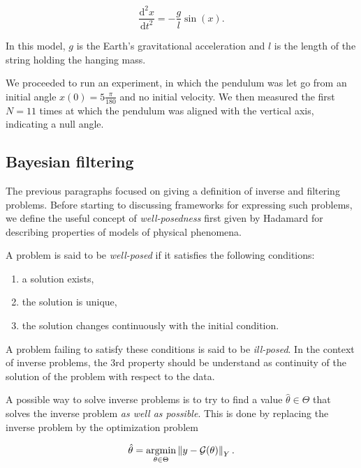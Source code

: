 \begin{equation}
  \frac{\text{d}^2x}{\text{d}t^2} = -\frac{g}{l}\sin(x).
\end{equation}

In this model, $g$ is the Earth's gravitational acceleration and $l$ is the length of the string holding the hanging mass.

We proceeded to run an experiment, in which the pendulum was let go from an initial angle $x(0) = 5\frac{\pi}{180}$ and no initial velocity. We then measured the first $N = 11$ times at which the pendulum was aligned with the vertical axis, indicating a null angle.

\subsection{Bayesian filtering}

The previous paragraphs focused on giving a definition of inverse and filtering problems. Before starting to discussing frameworks for expressing such problems, we define the useful concept of \textit{well-posedness} first given by Hadamard for describing properties of models of physical phenomena.

\begin{definition} A problem is said to be \textit{well-posed} if it satisfies the following conditions:
  \begin{enumerate}
  \item{a solution exists,}
  \item{the solution is unique,}
  \item{the solution changes continuously with the initial condition.}
  \end{enumerate}

  A problem failing to satisfy these conditions is said to be \textit{ill-posed}. In the context of inverse problems, the 3rd property should be understand as continuity of the solution of the problem with respect to the data.  
\end{definition}

A possible way to solve inverse problems is to try to find a value $\hat \theta \in \Theta$ that solves the inverse problem \textit{as well as possible}. This is done by replacing the inverse problem by the optimization problem

\begin{equation*}
  \hat\theta = \underset{\theta \in \Theta}{\text{argmin}} \left\lVert y - \mathcal{G}(\theta) \right\rVert_Y.
\end{equation*}

